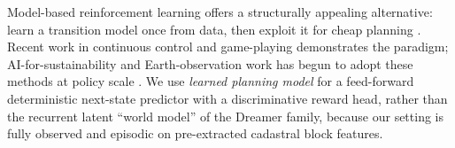 \documentclass[11pt]{article}
\begin{document}
Model-based reinforcement learning offers a structurally appealing alternative: learn a transition model once from data, then exploit it for cheap planning \citep{chua2018deep,janner2019trust}. Recent work in continuous control \citep{hafner2025dreamerv3,hansen2024tdmpc2} and game-playing \citep{schrittwieser2020muzero,silver2017mastering} demonstrates the paradigm; AI-for-sustainability and Earth-observation work has begun to adopt these methods at policy scale \citep{rolnick2022tackling,reichstein2019deep,tuia2024artificial}. We use \emph{learned planning model} for a feed-forward deterministic next-state predictor with a discriminative reward head, rather than the recurrent latent ``world model'' of the Dreamer family, because our setting is fully observed and episodic on pre-extracted cadastral block features.
\end{document}
